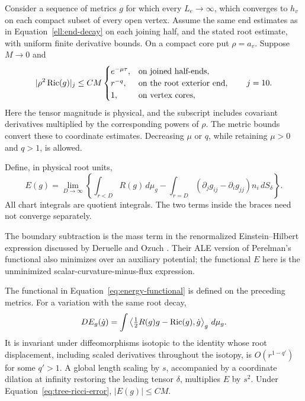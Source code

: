 Consider a sequence of metrics $g$ for which every $L_e\to\infty$,
which converges to $h_v$ on each compact subset of every open vertex.
Assume the same end estimates as in Equation~\eqref{ell:end-decay}
on each joining half, and the stated root estimate, with uniform
finite derivative bounds.  On a compact core put $\rho=a_v$.
Suppose $M\to0$ and
\begin{equation}
 |\rho^2\operatorname{Ric}(g)|_j\le CM
 \begin{cases}
 e^{-\mu\tau},&\text{on joined half-ends},\\
 r^{-q},&\text{on the root exterior end},\\
 1,&\text{on vertex cores},
 \end{cases}
 \qquad j=10.
 \label{eq:tree-ricci-error}
\end{equation}
Here the tensor magnitude is physical, and the subscript includes
covariant derivatives multiplied by the corresponding powers of
$\rho$.  The metric bounds convert these to coordinate estimates.
Decreasing $\mu$ or $q$, while retaining $\mu>0$ and $q>1$, is allowed.

Define, in physical root units,
\begin{equation}
 E(g)=\lim_{D\to\infty}\left\{
 \int_{r<D}R(g)\,d\mu_g-
 \int_{r=D}(\partial_jg_{ij}-\partial_ig_{jj})n_i\,dS_\delta
 \right\}.
 \label{eq:energy-functional}
\end{equation}
All chart integrals are quotient integrals.  The two terms inside the
braces need not converge separately.

The boundary subtraction is the mass term in the renormalized
Einstein--Hilbert expression discussed by Deruelle and Ozuch
\cite[Definition~4.2, Remark~4.3, and Proposition~4.4]{DeruelleOzuch2025}.
Their ALE version of Perelman's functional also minimizes over an
auxiliary potential; the functional $E$ here is the unminimized
scalar-curvature-minus-flux expression.

\begin{lemma}
\label{ell:functional}
The functional in Equation~\eqref{eq:energy-functional} is defined on
the preceding metrics.  For a variation with the same root decay,
\begin{equation}
 DE_g(\dot g)=\int\left\langle\tfrac12R(g)g-\operatorname{Ric}(g),\dot g\right\rangle_g
 \,d\mu_g.
 \label{ell:first-variation}
\end{equation}
It is invariant under diffeomorphisms isotopic to the identity whose
root displacement, including scaled derivatives throughout the
isotopy, is $O(r^{1-q'})$ for some $q'>1$.  A global length scaling
by $s$, accompanied by a coordinate dilation at infinity restoring
the leading tensor $\delta$, multiplies $E$ by $s^2$.
Under Equation~\eqref{eq:tree-ricci-error}, $|E(g)|\le CM$.
\end{lemma}

